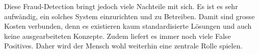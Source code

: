 Diese Fraud-Detection bringt jedoch viele Nachteile mit sich. Es ist es sehr aufwändig, ein solches System einzurichten und zu Betreiben. Damit sind grosse Kosten verbunden, denn es existieren kaum standardisierte Lösungen und auch keine ausgearbeiteten Konzepte. Zudem liefert es immer noch viele False Positives. Daher wird der Mensch wohl weiterhin eine zentrale Rolle spielen.